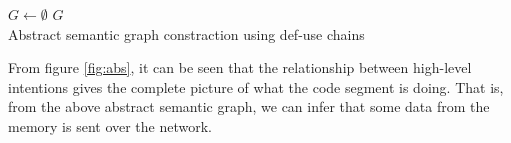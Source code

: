 \begin{MyAlgo}[!ht]{-4.9cm} %
 \DontPrintSemicolon
  $G \longleftarrow \emptyset$ \;%
  \Return ${G}$
  \\
 \caption{Abstract semantic graph constraction using def-use chains}\label{algo:def-use}
\end{MyAlgo}

From figure \ref{fig:abs}, it can be seen that the relationship between high-level intentions gives the complete picture of what the code segment is doing. That is, from the above abstract semantic graph, we can infer that some data from the memory is sent over the network.  

